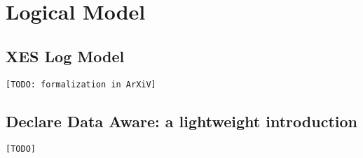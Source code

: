 \section{Logical Model}
\subsection{XES Log Model}\label{sec:XES}
\texttt{[TODO: formalization in ArXiV]}

\subsection{Declare Data Aware: a lightweight introduction}\label{sec:DAD}
\texttt{\color{red}[TODO]}
